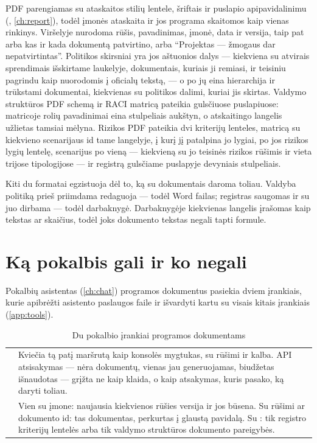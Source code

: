 PDF parengiamas su ataskaitos stilių lentele, šriftais ir puslapio apipavidalinimu
(, \cref{ch:report}), todėl įmonės ataskaita ir jos programa skaitomos
kaip vienas rinkinys. Viršelyje nurodoma rūšis, pavadinimas, įmonė, data ir versija, taip pat arba
kas ir kada dokumentą patvirtino, arba \enquote{Projektas --- žmogaus dar nepatvirtintas}.
Politikos skirsniai yra jos aštuonios dalys --- kiekviena su atvirais sprendimais išskirtame
laukelyje, dokumentais, kuriais ji remiasi, ir teisiniu pagrindu kaip nuorodomis į oficialų
tekstą, --- o po jų eina hierarchija ir trūkstami dokumentai, kiekvienas su politikos dalimi,
kuriai jis skirtas. Valdymo struktūros PDF schemą ir
RACI matricą pateikia gulsčiuose puslapiuose: matricoje rolių pavadinimai eina stulpeliais
aukštyn, o atskaitingo langelis užlietas tamsiai mėlyna. Rizikos PDF pateikia dvi kriterijų
lenteles, matricą su kiekvieno scenarijaus id tame langelyje, į kurį jį patalpina jo lygiai,
po jos rizikos lygių lentelę, scenarijus po vieną --- kiekvieną su jo teisinės rizikos
rūšimis ir vieta trijose tipologijose --- ir registrą gulsčiame puslapyje devyniais
stulpeliais.

Kiti du formatai egzistuoja dėl to, ką su dokumentais daroma toliau. Valdyba politiką prieš
priimdama redaguoja --- todėl Word failas; registras saugomas ir su juo dirbama --- todėl
darbaknygė. Darbaknygėje kiekvienas langelis įrašomas kaip tekstas ar skaičius, todėl joks
dokumento tekstas negali tapti formule.


\section{Ką pokalbis gali ir ko negali}\label{sec:programme:chat}

Pokalbių asistentas (\cref{ch:chat}) programos dokumentus pasiekia dviem įrankiais, kurie
apibrėžti asistento paslaugos faile  ir išvardyti kartu su visais
kitais įrankiais (\cref{app:tools}).

\begin{table}[H]
\caption{Du pokalbio įrankiai programos dokumentams}\label{tab:programme:chat}
\begin{tabularx}{\textwidth}{@{}L{34mm}Y@{}}
\toprule
{} &  \\
\midrule
{} & Kviečia tą patį maršrutą kaip konsolės mygtukas, su rūšimi ir kalba. API atsisakymas --- nėra dokumentų, vienas jau generuojamas, biudžetas išnaudotas --- grįžta ne kaip klaida, o kaip atsakymas, kuris pasako, ką daryti toliau. \\
 & Vien su įmone: naujausia kiekvienos rūšies versija ir jos būsena. Su rūšimi ar dokumento id: tas dokumentas, perkurtas į glaustą pavidalą. Su : tik registro kriterijų lentelės arba tik valdymo struktūros dokumento pareigybės. \\
\bottomrule
\end{tabularx}
\end{table}

